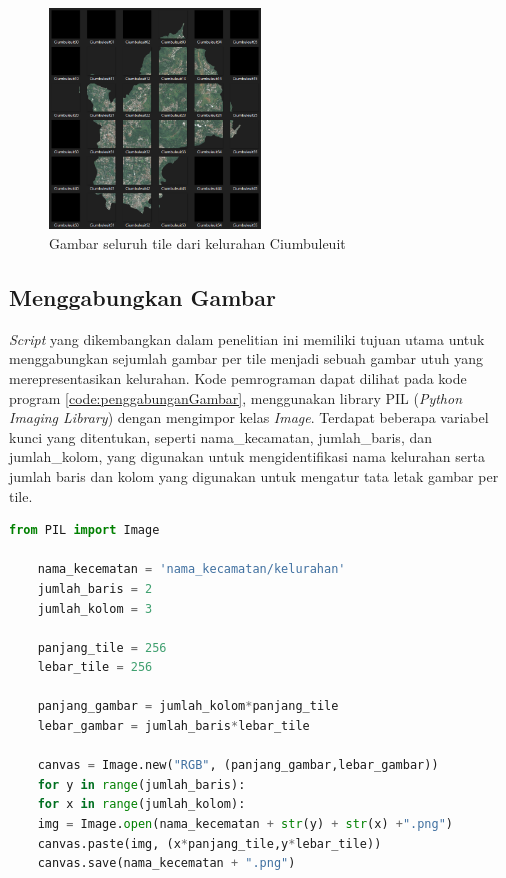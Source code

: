 \begin{figure}[H]
	\centering
	\includegraphics[width=0.5\textwidth]{Gambar/result gambar per tile.png}
	\caption{Gambar seluruh tile dari kelurahan Ciumbuleuit}
	\label{fig:pertileciumbuleuit}
\end{figure} 

\subsection{Menggabungkan Gambar}
\label{subsec:gabunggambar}
\textit{Script} yang dikembangkan dalam penelitian ini memiliki tujuan utama untuk menggabungkan sejumlah gambar per tile menjadi sebuah gambar utuh yang merepresentasikan kelurahan. Kode pemrograman dapat dilihat pada kode program \ref{code:penggabunganGambar}, menggunakan library PIL (\textit{Python Imaging Library}) dengan mengimpor kelas \textit{Image}. Terdapat beberapa variabel kunci yang ditentukan, seperti nama\_kecamatan, jumlah\_baris, dan jumlah\_kolom, yang digunakan untuk mengidentifikasi nama kelurahan serta jumlah baris dan kolom yang digunakan untuk mengatur tata letak gambar per tile.

\begin{lstlisting}[language=Python, caption=Script Penggabungan Gambar,label={code:penggabunganGambar}]
	from PIL import Image
	
	nama_kecematan = 'nama_kecamatan/kelurahan'
	jumlah_baris = 2
	jumlah_kolom = 3
	
	panjang_tile = 256
	lebar_tile = 256
	
	panjang_gambar = jumlah_kolom*panjang_tile
	lebar_gambar = jumlah_baris*lebar_tile
	
	canvas = Image.new("RGB", (panjang_gambar,lebar_gambar))
	for y in range(jumlah_baris):
	for x in range(jumlah_kolom):
	img = Image.open(nama_kecematan + str(y) + str(x) +".png")
	canvas.paste(img, (x*panjang_tile,y*lebar_tile))
	canvas.save(nama_kecematan + ".png")
	
\end{lstlisting}

